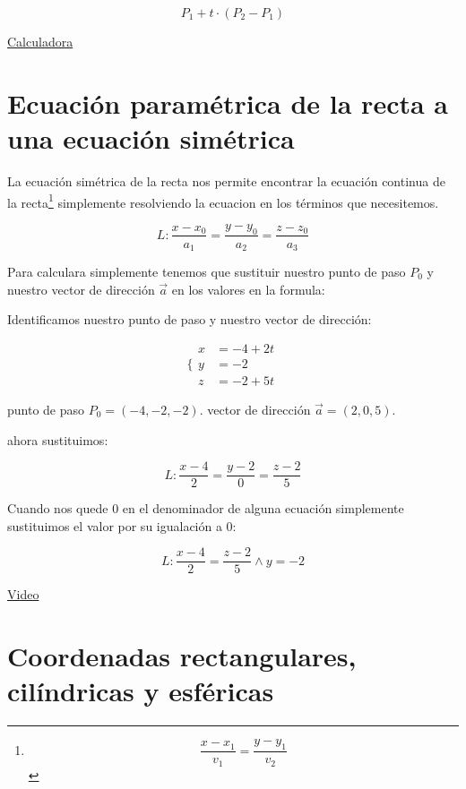 \documentclass[11pt]{article}
\begin{document}
\begin{DEMONSTRATION}
\[
P_1 + t \cdot (P_2 - P_1)
\]
\end{DEMONSTRATION}

\href{../calculadoras/calculo-recta.html}{Calculadora}

\section{Ecuación paramétrica de la recta a una ecuación simétrica}
\label{sec:org667a4ae}
La ecuación simétrica de la recta nos permite encontrar la ecuación continua de la recta\footnote{\[ \frac{x-x_1}{v_1} = \frac{y-y_1}{v_2} \]} simplemente resolviendo la ecuacion en los términos que necesitemos. 

\begin{DEMONSTRATION}
\[
L: \frac{x-x_0}{a_1} = \frac{y-y_0}{a_2} = \frac{z-z_0}{a_3}
\]
\end{DEMONSTRATION}

Para calculara simplemente tenemos que sustituir nuestro punto de paso \(P_0\) y nuestro vector de dirección \(\vec{a}\) en los valores en la formula:

\begin{DEMONSTRATION}
Identificamos nuestro punto de paso y nuestro vector de dirección:

\[
\Bigg\{ \begin{aligned}
     x &= -4 + 2t\\
     y &= -2  \\
     z &= -2 +5t
\end{aligned} 
\]

punto de paso \(P_0 = (-4,-2,-2)\).
vector de dirección \(\vec{a} = (2,0,5)\).

ahora sustituimos:

\[
L: \frac{x-4}{2} = \frac{y-2}{0} = \frac{z-2}{5}
\]

Cuando nos quede 0 en el denominador de alguna ecuación simplemente sustituimos el valor por su igualación a 0:

\[
L: \frac{x-4}{2} = \frac{z-2}{5} \land y = -2
\]
\end{DEMONSTRATION}

\href{https://youtu.be/JMVEYTqdh6c}{Video}


\section{Coordenadas rectangulares, cilíndricas y esféricas}
\label{sec:orgb2f5216}
\end{document}
